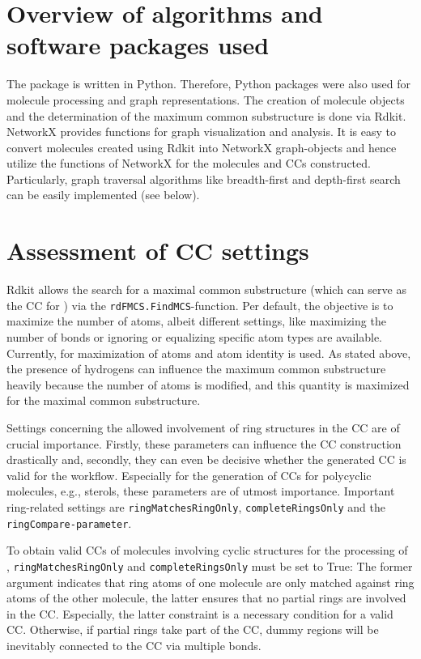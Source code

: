 \section{Overview of algorithms and software packages used}

The {\trafo} package is written in Python. Therefore, Python packages
were also used for molecule processing and graph representations.
The creation of molecule objects and the determination of the maximum
common substructure is done via Rdkit\cite{key-3}. NetworkX\cite{AricA.Hagberg.2008}
provides functions for graph visualization and analysis. It is easy to convert molecules created using Rdkit into NetworkX graph-objects
and hence utilize the functions of NetworkX for the molecules and
CCs constructed. Particularly, graph traversal algorithms
like breadth-first and depth-first search can be easily implemented
(see below).

\section{Assessment of CC settings}

Rdkit allows the search for a maximal common substructure (which can
serve as the CC for {\trafo}) via the \texttt{rdFMCS.FindMCS}-function.
Per default, the objective is to maximize the number of atoms, albeit
different settings, like maximizing the number of bonds or ignoring
or equalizing specific atom types are available. Currently, for
{\trafo} maximization of atoms and atom identity is used. As stated above, the presence of hydrogens can influence
the maximum common substructure heavily because the number of atoms is modified, and this quantity is maximized for the maximal common substructure. 

Settings concerning the allowed involvement of ring structures in
the CC are of crucial importance. Firstly, these parameters
can influence the CC construction drastically and, secondly, they
can even be decisive whether the generated CC is valid for the
{\trafo} workflow.
Especially for the generation of CCs for polycyclic molecules, e.g., sterols, these parameters are of utmost importance.  
Important ring-related settings are \texttt{ringMatchesRingOnly}, \texttt{completeRingsOnly}
and the \texttt{ringCompare-parameter}. 

To obtain valid CCs of molecules involving cyclic structures for the processing of {\trafo}, \texttt{ringMatchesRingOnly}
and \texttt{completeRingsOnly} must be set to True: The former argument indicates
that ring atoms of one molecule are only matched against ring atoms
of the other molecule, the latter ensures that no partial rings are
involved in the CC. Especially, the latter constraint is a
necessary condition for a valid CC. Otherwise, if partial
rings take part of the CC, dummy regions will be inevitably
connected to the CC via multiple bonds.

